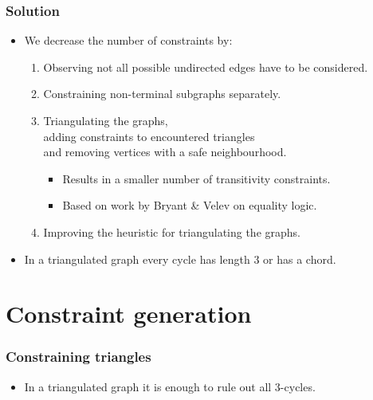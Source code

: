 \documentclass{beamer}
\begin{document}
\begin{frame}
    \frametitle{Solution}
    \begin{itemize}
        \item We decrease the number of constraints by:
        \begin{enumerate}
            \item Observing not all possible undirected edges have to be considered.
            \item Constraining non-terminal subgraphs separately.
            \item Triangulating the graphs,\\
                    adding constraints to encountered triangles\\
                    and removing vertices with a safe neighbourhood.
            \begin{itemize}
                \item Results in a smaller number of transitivity constraints.
                \item Based on work by Bryant \& Velev on equality logic.
            \end{itemize}
            \item Improving the heuristic for triangulating the graphs.
        \end{enumerate}
        \item In a triangulated graph every cycle has length 3 or has a chord.
    \end{itemize}
\end{frame}

\section{Constraint generation}
\begin{frame}
    \frametitle{Constraining triangles}
    \begin{itemize}
        \item In a triangulated graph it is enough to rule out all 3-cycles.
    \end{itemize}
    \begin{figure}
    \end{figure}
\end{frame}
\end{document}
